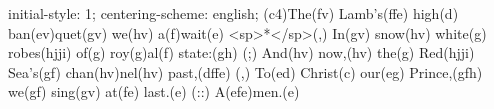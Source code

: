 initial-style: 1;
centering-scheme: english;
(c4)The(fv) Lamb's(ffe) high(d) ban(ev)quet(gv) we(hv) a(f)wait(e) <sp>*</sp>(,)
In(gv) snow(hv) white(g) robes(hjji) of(g) roy(g)al(f) state:(gh) (;)
And(hv) now,(hv) the(g) Red(hjji) Sea's(gf) chan(hv)nel(hv) past,(dffe) (,)
To(ed) Christ(c) our(eg) Prince,(gfh) we(gf) sing(gv) at(fe) last.(e) (::)
A(efe)men.(e)